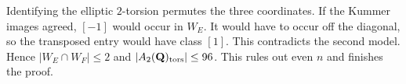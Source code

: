 \documentclass[11pt]{article}
\begin{document}
Identifying the elliptic $2$-torsion permutes the three coordinates. If the Kummer images agreed, $[-1]$ would occur in $W_E$. It would have to occur off the diagonal, so the transposed entry would have class $[1]$. This contradicts the second model. Hence $|W_E\cap W_F|\le2$ and $|A_2(\mathbf Q)_{\rm tors}|\le96$. This rules out even $n$ and finishes the proof.
\end{document}
